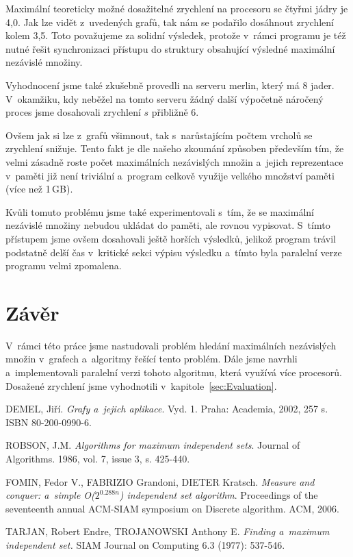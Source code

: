 \documentclass[12pt]{article}
\begin{document}
Maximální teoreticky možné dosažitelné zrychlení na procesoru se čtyřmi jádry je 4,0. Jak lze vidět z~uvedených grafů, tak nám se podařilo dosáhnout zrychlení kolem 3,5. Toto považujeme za solidní výsledek, protože v~rámci programu je též nutné řešit synchronizaci přístupu do struktury obsahující výsledné maximální nezávislé množiny.

Vyhodnocení jsme také zkušebně provedli na serveru merlin, který má 8 jader. V~okamžiku, kdy neběžel na tomto serveru žádný další výpočetně náročený proces jsme dosahovali zrychlení $s$ přibližně 6.  

Ovšem jak si lze z~grafů všimnout, tak s~narůstajícím počtem vrcholů se zrychlení snižuje. Tento fakt je dle našeho zkoumání způsoben především tím, že velmi zásadně roste počet maximálních nezávislých množin a~jejich reprezentace v~paměti již není triviální a~program celkově využije velkého množství paměti (více než 1\,GB). 

Kvůli tomuto problému jsme také experimentovali s~tím, že se maximální nezávislé množiny nebudou ukládat do paměti, ale rovnou vypisovat. S~tímto přístupem jsme ovšem dosahovali ještě horších výsledků, jelikož program trávil podstatně delší čas v~kritické sekci výpisu výsledku a~tímto byla paralelní verze programu velmi zpomalena. 

\section{Závěr}
V~rámci této práce jsme nastudovali problém hledání maximálních nezávislých množin v~grafech a~algoritmy řešící tento problém. Dále jsme navrhli a~implementovali paralelní verzi tohoto algoritmu, která využívá více procesorů. Dosažené zrychlení jsme vyhodnotili v~kapitole~\ref{sec:Evaluation}.


\begin{thebibliography}{99}

    DEMEL, Jiří. \emph{Grafy a~jejich aplikace}. Vyd. 1. Praha: Academia, 2002, 257 s. ISBN 80-200-0990-6.

ROBSON, J.M. \emph{Algorithms for maximum independent sets}. Journal of Algorithms. 1986, vol. 7, issue 3, s. 425-440.

  FOMIN, Fedor V., FABRIZIO Grandoni, DIETER Kratsch.
  \emph{Measure and conquer: a~simple O($2^{0.288n}$) independent set algorithm}.
  Proceedings of the seventeenth annual ACM-SIAM symposium on Discrete algorithm.
   ACM, 2006.

  TARJAN, Robert Endre, TROJANOWSKI Anthony E.
  \emph{Finding a~maximum independent set.}
  SIAM Journal on Computing 6.3 (1977): 537-546.

\end{thebibliography}
\end{document}
